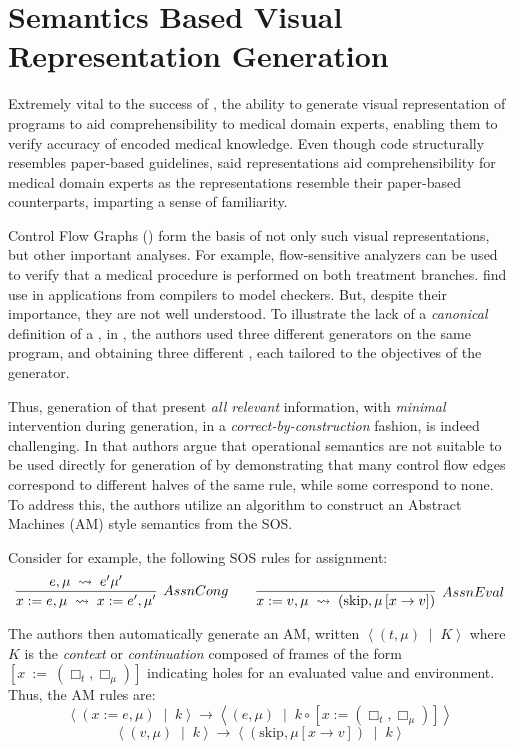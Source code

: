 \section{Semantics Based Visual Representation Generation}\label{subsec:visual-representation-generation}

Extremely vital to the success of \MediK{}, the ability
to generate visual representation of \MediK{} programs to aid
comprehensibility to medical domain experts, enabling them to verify
accuracy of encoded medical knowledge. Even though \MediK{} code
structurally resembles paper-based guidelines, said
representations aid comprehensibility for medical
domain experts as the representations resemble their paper-based counterparts,
imparting a sense of familiarity.

Control Flow Graphs (\CFGs{}) form the basis of not only such visual
representations, but other important analyses. For example,
flow-sensitive analyzers can be used to verify that a medical procedure
is performed on both treatment branches.
\CFGs{} find use in applications from compilers to model checkers.
But, despite their importance, they are not well understood.
To illustrate the lack of a \emph{canonical} definition of a \CFG{},
in \cite{KoppelICFP22}, the authors
used three different \CFG{} generators
on the same program, and obtaining three different \CFGs{}, each
tailored to the objectives of the generator.

Thus, generation of \CFGs{} that present \emph{all relevant} information,
with \emph{minimal} intervention during generation, in a
\emph{correct-by-construction} fashion, is indeed challenging.
In \cite{KoppelICFP22} that authors argue that operational semantics
are not suitable to be used directly for generation of \CFGs{} by demonstrating
that many control flow edges correspond to different halves of the same rule,
while some correspond to none. To address this, the authors utilize an algorithm
to construct an Abstract Machines (AM) style semantics from the SOS.

Consider for example, the following SOS rules for assignment:
$$
\infer[AssnCong]
{x := e, \mu\; \leadsto\; x := e^{\prime}, \mu^{\prime}}{e, \mu\; \leadsto\; e^{\prime}\mu^{\prime}}
\quad \quad
\infer[AssnEval]
{x := v,\mu\; \leadsto\; \left(\text{skip}, \mu\left[x \rightarrow v\right]\right)}{}
$$

The authors then automatically generate an AM, written
$\left\langle \left(t, \mu\right) \;\mid\; K\right\rangle$ where $K$ is the
\emph{context} or \emph{continuation} composed of frames of the form $[x\ :=\
(\Box_{t}, \Box_{\mu})]$ indicating holes for an evaluated value and
environment. Thus, the AM rules are:
$$
\left\langle \left( x := e, \mu \right)\;\mid\; k \right\rangle \rightarrow
\left\langle \left( e, \mu \right)\;\mid\; k \circ \left[x := \left(\Box_t,\Box_{\mu}\right) \right]\right\rangle
$$
$$
\left\langle \left( v, \mu \right)\;\mid\; k \right\rangle \rightarrow
\left\langle \left(\text{skip}, \mu\left[x \rightarrow v \right] \right) \;\mid\; k \right\rangle
$$

